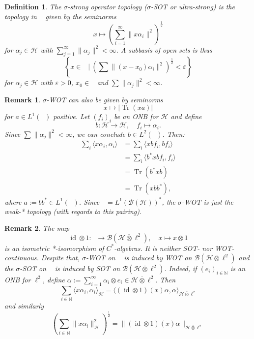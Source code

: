 \documentclass[10pt, a4paper]{article}
\newtheorem{defi}[thm]{Definition}
\newenvironment{noticeB}{%
  \tcolorbox[%
  notitle,
  empty,
  enhanced,  %
  breakable,
  coltext=black,
  colback=white, 
  fontupper=\rmfamily,
  noparskip,
  sharp corners,
  boxrule=-1pt,  %
  frame hidden,
  left=7pt,  %
  right=7pt,
  top=5pt,
  bottom=5pt,
  before skip=2.5ex plus 2pt,
  after skip=2.5ex plus 2pt,
  borderline west = {1.5pt}{-0.1pt}{blue!30!black}, %
  overlay unbroken and last={%
    \draw[color=black, line width=1.25pt]
    ($(frame.south west)+(1.pt, -0.1pt)$) -- ++(2em, 0);
  }
  ]}
{\endtcolorbox}
\newenvironment{definition}{\begin{noticeB}\begin{defi}}{%
    \end{defi}\end{noticeB}}
\newtheorem*{remark}{Remark}
\newcommand{\N}{\mathbb {N}}
\DeclareMathOperator{\trace}{Tr}
\DeclareMathOperator{\id}{id}
\DeclareMathOperator{\bh}{\mathcal{B} (\mathcal{H})}
\begin{document}
\begin{definition}
  The $\sigma$-strong operator topology ($\sigma$-SOT or ultra-strong) is the topology in $\bh$
  given by the seminorms $$x \mapsto \left( \sum_{i = 1} ^\infty \| x \alpha_i \|^2\right)^{\frac{1}{2}}$$
  for $\alpha_j \in \mathcal{H}$ with $\sum_{j = 1} ^\infty \| \alpha_j \|^2 < \infty$.
  A subbasis of open sets is thus 
  $$\left\lbrace x \in \bh\ |\ \left( \sum \| (x - x_0) \alpha_i\|^2 \right)^{\frac{1}{2}} < \varepsilon \right\rbrace$$
  for $\alpha_j \in \mathcal{H}$ with $\varepsilon > 0$, $x_0 \in \bh$ and $\sum \| \alpha_j\|^2 < \infty$.
\end{definition}

\begin{remark}
  $\sigma$-WOT can also be given by seminorms 
  $$x \mapsto |\trace (xa) |$$
  for $a \in L^1 (\bh)$ positive.
  Let $(f_i)_i$ be an ONB for $\mathcal{H}$ and define 
  $$b: \mathcal{H} \to \mathcal{H},\quad f_i \mapsto \alpha_i.$$
  Since $\sum \| \alpha_j \|^2 < \infty$, we can conclude $b \in L^2 (\bh)$.
  Then:
  \begin{align*}
    \sum_i \langle x \alpha_i, \alpha_i \rangle &= \sum_i \langle xb f_i, b f_i\rangle\\
    &= \sum_i \langle b^* x bf_i, f_i\rangle\\
    &= \trace (b^* xb)\\
    &= \trace (xbb^*),
  \end{align*}
  where $a := b b^* \in L^1 (\bh)$. Since $\bh = L^1 (\mathcal{B} (\mathcal{H}))^*$,
  the $\sigma$-WOT is just the weak-* topology (with regards to this pairing).
\end{remark}

\begin{remark}
  The map 
  $$\id \otimes 1: \bh \to \mathcal{B} (\mathcal{H} \overline{\otimes} \ell^2),\quad x \mapsto x \otimes 1$$
  is an isometric *-isomorphism of $C^*$-algebras. It is neither SOT- nor WOT-continuous.
  Despite that, $\sigma$-WOT on $\bh$ is induced by WOT on $\mathcal{B} (\mathcal{H} \overline{\otimes} \ell^2)$ 
  and the $\sigma$-SOT on $\bh$ is induced by SOT on $\mathcal{B} (\mathcal{H} \overline{\otimes} \ell^2)$. 
  Indeed, if $(e_i)_{i \in \N}$ is an ONB for $\ell^2$, define $\alpha := \sum_{i = 1} ^\infty \alpha_i \otimes e_i \in \mathcal{H} \overline{\otimes} \ell^2$.
  Then 
  $$\sum_{i \in \N} \langle x \alpha_i, \alpha_i \rangle_{\mathcal{H}} = \langle (\id \otimes 1)(x) \alpha, \alpha \rangle_{\mathcal{H} \overline{\otimes} \ell^2}$$ 
  and similarly $$\left(\sum_{i \in \N}  \| x \alpha_i \|^2 _{\mathcal{H}}\right)^{\frac{1}{2}} = \| (\id \otimes 1)(x) \alpha \|_{\mathcal{H} \overline{\otimes} \ell^2}$$ 
\end{remark}
\end{document}

